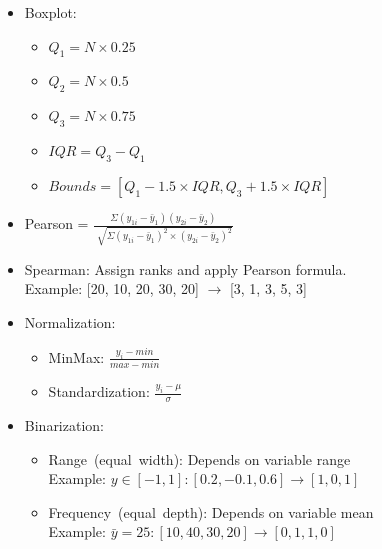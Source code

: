 \documentclass[twocolumn, 10pt]{article}
\begin{document}
\begin{itemize}[leftmargin=*, itemsep=0pt]
    
    \item Boxplot:
    \begin{itemize}[topsep=0pt]
        \item $Q_{1}=N\times0.25$
        \item $Q_{2}=N\times0.5$
        \item $Q_{3}=N\times0.75$
        \item $IQR=Q_{3}-Q_{1}$
        \item $Bounds=[Q_{1}-1.5 \times IQR, Q_{3}+1.5 \times IQR]$
    \end{itemize}

    \item Pearson = $\displaystyle \frac{\Sigma(y_{1i}-\bar{y}_{1})(y_{2i}-\bar{y}_{2})}{\sqrt[]{\Sigma(y_{1i}-\bar{y}_{1})^2\times(y_{2i}-\bar{y}_{2})^2}}$

    \item Spearman: Assign ranks and apply Pearson formula. \\
    Example: [20, 10, 20, 30, 20] $\rightarrow$ [3, 1, 3, 5, 3]

    \item Normalization:
    \begin{itemize}[topsep=0pt, itemsep=0pt]
        \item MinMax: $\displaystyle \frac{y_i-min}{max-min}$
        \item Standardization: $\displaystyle \frac{y_i-\mu}{\sigma}$
    \end{itemize}

    \item Binarization: 
    \begin{itemize}[topsep=0pt]
        \item Range\ (equal\ width): Depends on variable range \\
        Example: $y\in[-1,1]: [0.2, -0.1, 0.6] \rightarrow [1, 0, 1]$
        \item Frequency\ (equal\ depth): Depends on variable mean \\
        Example: $\bar{y}=25: [10, 40, 30, 20] \rightarrow [0, 1, 1, 0]$
    \end{itemize} 


\end{itemize}
\end{document}
